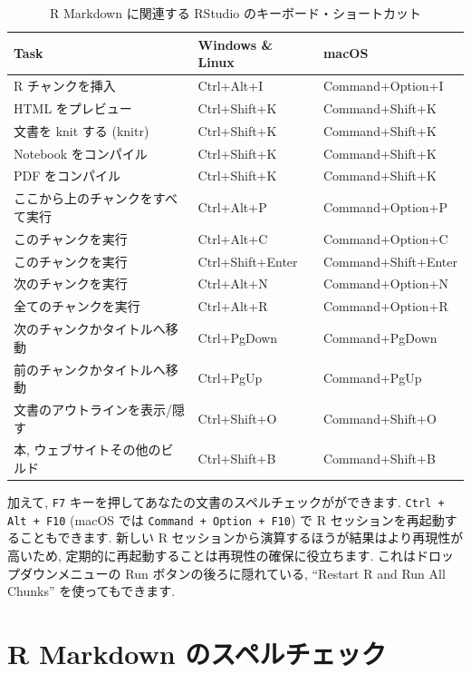 \documentclass[
  11pt,
  lualatex,
  ja=standard]{bxjsreport}
\begin{document}
\begin{table}

\caption{\label{tab:shortcuts}R Markdown に関連する RStudio のキーボード・ショートカット}
\centering
\begin{tabular}[t]{lll}
\toprule
Task & Windows \& Linux & macOS\\
\midrule
R チャンクを挿入 & Ctrl+Alt+I & Command+Option+I\\
HTML をプレビュー & Ctrl+Shift+K & Command+Shift+K\\
文書を knit する (knitr) & Ctrl+Shift+K & Command+Shift+K\\
Notebook をコンパイル & Ctrl+Shift+K & Command+Shift+K\\
PDF をコンパイル & Ctrl+Shift+K & Command+Shift+K\\
\addlinespace
ここから上のチャンクをすべて実行 & Ctrl+Alt+P & Command+Option+P\\
このチャンクを実行 & Ctrl+Alt+C & Command+Option+C\\
このチャンクを実行 & Ctrl+Shift+Enter & Command+Shift+Enter\\
次のチャンクを実行 & Ctrl+Alt+N & Command+Option+N\\
全てのチャンクを実行 & Ctrl+Alt+R & Command+Option+R\\
\addlinespace
次のチャンクかタイトルへ移動 & Ctrl+PgDown & Command+PgDown\\
前のチャンクかタイトルへ移動 & Ctrl+PgUp & Command+PgUp\\
文書のアウトラインを表示/隠す & Ctrl+Shift+O & Command+Shift+O\\
本, ウェブサイトその他のビルド & Ctrl+Shift+B & Command+Shift+B\\
\bottomrule
\end{tabular}
\end{table}

加えて, \texttt{F7} キーを押してあなたの文書のスペルチェックがができます. \texttt{Ctrl + Alt + F10} (macOS では \texttt{Command + Option + F10}) で R セッションを再起動することもできます. 新しい R セッションから演算するほうが結果はより再現性が高いため, 定期的に再起動することは再現性の確保に役立ちます. これはドロップダウンメニューの Run ボタンの後ろに隠れている, ``Restart R and Run All Chunks'' を使ってもできます.

\hypertarget{spell-check}{%
\section{R Markdown のスペルチェック}\label{spell-check}}
\end{document}
